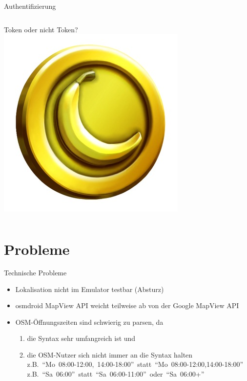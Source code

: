 \documentclass[hyperref]{beamer}
\begin{document}
\begin{frame}{Authentifizierung}
	\begin{columns}
		\column{5.1cm}
		Token oder nicht Token?		
		\column{5cm}
		\includegraphics[scale=0.35]{Token.png}
	\end{columns}
\end{frame}




\section{Probleme}


\begin{frame}{Technische Probleme}
	\begin{itemize}
		\item Lokalisation nicht im Emulator testbar (Absturz)
        \item osmdroid MapView API weicht teilweise ab von der Google MapView API
		\item OSM-Öffnungszeiten sind schwierig zu parsen, da
		\begin{enumerate}
		  \item die Syntax sehr umfangreich ist und
		  \item die OSM-Nutzer sich nicht immer an die Syntax halten\\
		  \vspace*{0.1cm}
		  \mbox{z.B. ``Mo 08:00-12:00, 14:00-18:00'' statt ``Mo 08:00-12:00,14:00-18:00''}\\
		  \mbox{z.B. ``Sa 06:00'' statt ``Sa 06:00-11:00'' oder ``Sa 06:00+''}
		\end{enumerate}

	\end{itemize}
\end{frame}
\end{document}
